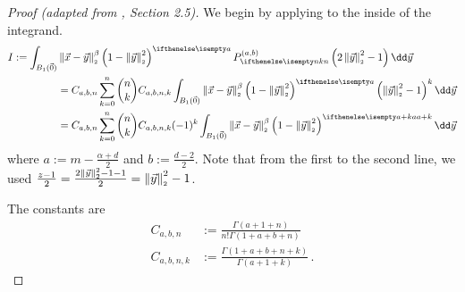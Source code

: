 \begin{proof}[Proof (adapted from \cite{2021-arbitrary-dimensions}, Section 2.5)]
  We begin by applying  to the inside of the integrand.
  \begin{align*}
    I := \int_{B_1(\vec{0})} & \norm{\vec{x}-\vec{y}}^\beta \weight{y} \jacobi[n]{y} \dd\vec{y}                                                                                             \\
                             & = C_{a,b,n} \sum_{k=0}^n \binom{n}{k} C_{a,b,n,k} \int_{B_1(\vec{0})} \norm{\vec{x}-\vec{y}}^\beta \weight{y} \left(\norm{\vec{y}}^2 - 1\right)^k \dd\vec{y} \\
                             & = C_{a,b,n} \sum_{k=0}^n \binom{n}{k} C_{a,b,n,k} (-1)^k \int_{B_1(\vec{0})} \norm{\vec{x}-\vec{y}}^\beta \weight[a+k]{y} \dd\vec{y}
  \end{align*}
  where $a := m-\frac{\alpha+d}{2}$ and $b := \frac{d-2}{2}$.
  Note that from the first to the second line, we used $\frac{z-1}{2} = \frac{2\left\lVert\vec{y}\right\rVert_{\scriptscriptstyle 2}^2-1 - 1}{2} = \left\lVert\vec{y}\right\rVert_{\scriptscriptstyle 2}^2 - 1$.

  The constants are
  \begin{align*}
    C_{a,b,n}   & := \frac{\Gamma(a+1+n)}{n! \Gamma(1+a+b+n)}     \\
    C_{a,b,n,k} & := \frac{\Gamma(1+a+b+n + k)}{\Gamma(a+1+k)}\,.
  \end{align*}


\end{proof}
